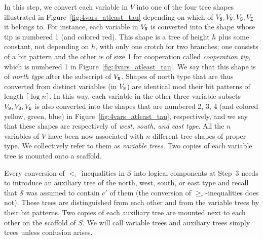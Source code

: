 \documentclass{article}
\theoremstyle{remark}
\theoremstyle{definition}
\newcommand{\north}{{\tt N}}
\newcommand{\west}{{\tt W}}
\newcommand{\south}{{\tt S}}
\newcommand{\east}{{\tt E}}
\begin{document}
In this step, we convert each variable in $V$ into one of the four tree shapes illustrated in Figure~\ref{fig:4vars_atleast_tau} depending on which of $V_\north, V_\west, V_\south, V_\east$ it belongs to. 
For instance, each variable in $V_\north$ is converted into the shape whose tip is numbered 1 (and colored red). 
This shape is a tree of height $h$ plus some constant, not depending on $h$, with only one crotch for two branches; one consists of a bit pattern and the other is of size 1 for cooperation called {\it cooperation tip}, which is numbered 1 in Figure~\ref{fig:4vars_atleast_tau}. 
We say that this shape is of {\it north type} after the subscript of $V_\north$. 
Shapes of north type that are thus converted from distinct variables (in $V_\north$) are identical mod their bit patterns of length $\lceil \log n \rceil$. 
In this way, each variable in the other three variable subsets $V_\west, V_\south, V_\east$ is also converted into the shapes that are numbered 2, 3, 4 (and colored yellow, green, blue) in Figure~\ref{fig:4vars_atleast_tau}, respectively, and we say that these shapes are respectively of {\it west, south, and east type}. 
All the $n$ variables of $V$ have been now associated with $n$ different tree shapes of proper type. 
We collectively refer to them as {\it variable trees}. 
Two copies of each variable tree is mounted onto a scaffold. 

Every conversion of $<_\tau$-inequalities in $\mathcal{S}$ into logical components at Step~3 needs to introduce an auxiliary tree of the north, west, south, or east type and recall that $\mathcal{S}$ was assumed to contain $c'$ of them (the conversion of $\ge_\tau$-inequalities does not). 
These trees are distinguished from each other and from the variable trees by their bit patterns. 
Two copies of each auxiliary tree are mounted next to each other on the scaffold of $S$. 
We will call variable trees and auxiliary trees simply trees unless confusion arises. 
\end{document}
